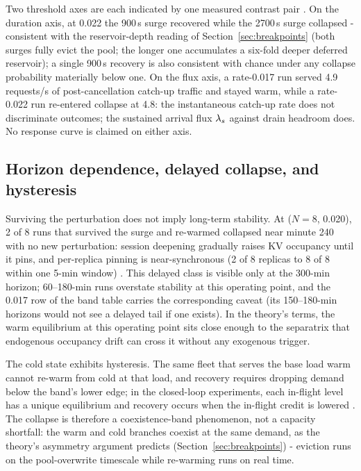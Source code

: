 Two threshold axes are each indicated by one measured contrast pair
. On the duration axis, at 0.022 the 900\,s surge recovered
while the 2700\,s surge collapsed - consistent with the
reservoir-depth reading of Section~\ref{sec:breakpoints} (both surges fully evict the
pool; the longer one accumulates a six-fold deeper deferred
reservoir); a single 900\,s recovery is also consistent with chance
under any collapse probability materially below one. On the flux
axis, a rate-0.017 run served 4.9 requests/s of post-cancellation
catch-up traffic and stayed warm, while a rate-0.022 run re-entered
collapse at 4.8: the instantaneous catch-up rate does not
discriminate outcomes; the sustained arrival flux $\lambda_s$ against
drain headroom does. No response curve is claimed on either axis.

\subsection{Horizon dependence, delayed collapse, and hysteresis}
\label{sec:horizon}

Surviving the perturbation does not imply long-term stability. At
($N{=}8$, 0.020), 2 of 8 runs that survived the surge and re-warmed
collapsed near minute 240 with no new perturbation: session
deepening gradually raises KV occupancy until it pins, and
per-replica pinning is near-synchronous (2 of 8 replicas to 8 of 8
within one 5-min window) . This delayed class is visible
only at the 300-min horizon; 60--180-min runs overstate stability at
this operating point, and the 0.017 row of the band table carries
the corresponding caveat (its 150--180-min horizons would not see a
delayed tail if one exists). In the theory's terms, the warm
equilibrium at this operating point sits close enough to the
separatrix that endogenous occupancy drift can cross it without any
exogenous trigger.

The cold state exhibits hysteresis. The same fleet that serves the
base load warm cannot re-warm from cold at that load, and recovery
requires dropping demand below the band's lower edge; in the
closed-loop experiments, each in-flight level has a unique
equilibrium and recovery occurs when the in-flight credit is lowered
. The collapse is therefore a coexistence-band
phenomenon, not a capacity shortfall: the warm and cold branches
coexist at the same demand, as the theory's asymmetry argument
predicts (Section~\ref{sec:breakpoints}) - eviction runs on the pool-overwrite
timescale while re-warming runs on real time.

